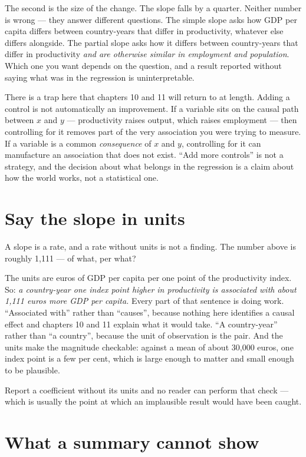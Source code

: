 \documentclass[
  letterpaper,
  10pt,
  twoside,
  openright,
  numbers=noenddot,
  chapterprefix=true]{scrbook}
\begin{document}
The second is the size of the change. The slope falls by a quarter.
Neither number is wrong --- they answer different questions. The simple
slope asks how GDP per capita differs between country-years that differ
in productivity, whatever else differs alongside. The partial slope asks
how it differs between country-years that differ in productivity
\emph{and are otherwise similar in employment and population}. Which one
you want depends on the question, and a result reported without saying
what was in the regression is uninterpretable.

There is a trap here that chapters 10 and 11 will return to at length.
Adding a control is not automatically an improvement. If a variable sits
on the causal path between \(x\) and \(y\) --- productivity raises
output, which raises employment --- then controlling for it removes part
of the very association you were trying to measure. If a variable is a
common \emph{consequence} of \(x\) and \(y\), controlling for it can
manufacture an association that does not exist. ``Add more controls'' is
not a strategy, and the decision about what belongs in the regression is
a claim about how the world works, not a statistical one.

\section{Say the slope in units}\label{say-the-slope-in-units}

A slope is a rate, and a rate without units is not a finding. The number
above is roughly 1,111 --- of what, per what?

The units are euros of GDP per capita per one point of the productivity
index. So: \emph{a country-year one index point higher in productivity
is associated with about 1,111 euros more GDP per capita.} Every part of
that sentence is doing work. ``Associated with'' rather than ``causes'',
because nothing here identifies a causal effect and chapters 10 and 11
explain what it would take. ``A country-year'' rather than ``a
country'', because the unit of observation is the pair. And the units
make the magnitude checkable: against a mean of about 30,000 euros, one
index point is a few per cent, which is large enough to matter and small
enough to be plausible.

Report a coefficient without its units and no reader can perform that
check --- which is usually the point at which an implausible result
would have been caught.

\section{What a summary cannot show}\label{what-a-summary-cannot-show}
\end{document}
